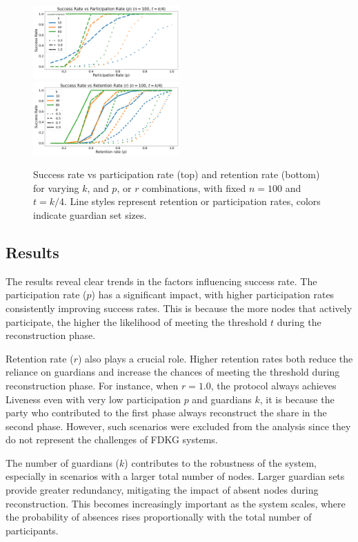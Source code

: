 \documentclass[lettersize,journal]{IEEEtran}
\theoremstyle{definition}
\begin{document}
\begin{figure}[htbp]
        \centering
        \includegraphics[width=0.5\textwidth]{parameters_significance_participation_axis.png}
        \includegraphics[width=0.5\textwidth]{parameters_significance_retention_axis.png}
        \caption{Success rate vs participation rate (top) and retention rate (bottom) for varying $k$, and $p$, or $r$ combinations, with fixed $n=100$ and $t=k/4$. Line styles represent retention or participation rates, colors indicate guardian set sizes.}
    \label{fig:parameters_significance_participation}
\end{figure}

\subsection{Results}

The results reveal clear trends in the factors influencing success rate. The participation rate ($p$) has a significant impact, with higher participation rates consistently improving success rates. This is because the more nodes that actively participate, the higher the likelihood of meeting the threshold \(t\) during the reconstruction phase.

Retention rate ($r$) also plays a crucial role. Higher retention rates both reduce the reliance on guardians and increase the chances of meeting the threshold during reconstruction phase. For instance, when $r = 1.0$, the protocol always achieves Liveness even with very low participation $p$ and guardians $k$, it is because the party who contributed to the first phase always reconstruct the share in the second phase. However, such scenarios were excluded from the analysis since they do not represent the challenges of FDKG systems.

The number of guardians ($k$) contributes to the robustness of the system, especially in scenarios with a larger total number of nodes. Larger guardian sets provide greater redundancy, mitigating the impact of absent nodes during reconstruction. This becomes increasingly important as the system scales, where the probability of absences rises proportionally with the total number of participants.
\end{document}
